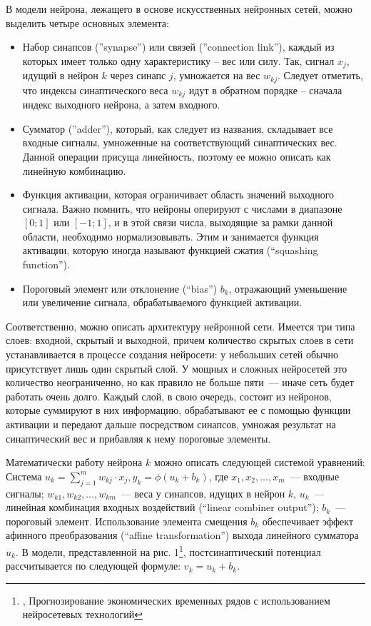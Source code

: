 \documentclass[12pt, a4paper]{article}
\begin{document}
В модели нейрона, лежащего в основе искусственных нейронных сетей, можно выделить четыре основных элемента:
\begin{itemize}
  	\item Набор синапсов (”synapse”) или связей (”connection link”), каждый из которых имеет только одну характеристику – вес или силу. Так, сигнал $x_j$, идущий в нейрон $k$ через синапс $j$, умножается на вес $w_{kj}$. Следует отметить, что индексы синаптического веса $w_{kj}$ идут в обратном порядке – сначала индекс выходного нейрона, а затем входного.
		\item Сумматор (”adder”), который, как следует из названия, складывает все входные сигналы, умноженные на соответствующий синаптических вес. Данной операции присуща линейность, поэтому ее можно описать как линейную комбинацию.
		\item Функция активации, которая ограничивает область значений выходного сигнала. Важно помнить, что нейроны оперируют с числами в диапазоне $[0; 1]$ или $[-1; 1]$, и в этой связи числа, выходящие за рамки данной области, необходимо нормализовывать. Этим и занимается функция активации, которую иногда называют функцией сжатия (“squashing function”).
		\item Пороговый элемент или отклонение (“bias”) $b_k$, отражающий уменьшение или увеличение сигнала, обрабатываемого функцией активации.
\end{itemize}

Соответственно, можно описать архитектуру нейронной сети. Имеется три типа слоев: входной, скрытый и выходной, причем количество скрытых слоев в сети устанавливается в процессе создания нейросети: у небольших сетей обычно присутствует лишь один скрытый слой.
У мощных и сложных нейросетей это количество неограниченно, но как правило не больше пяти~--- иначе сеть будет работать очень долго. Каждый слой, в свою очередь, состоит из нейронов, которые суммируют в них информацию, обрабатывают ее с помощью функции активации и передают дальше посредством синапсов, умножая результат на синаптический вес и прибавляя к нему пороговые элементы.

Математически работу нейрона $k$ можно описать следующей системой уравнений:
Система $u_k = \sum_{j=1}^m w_{kj} \cdot x_j, y_k = \phi (u_k + b_k)$, где $x_1, x_2, …, x_m$~--- входные сигналы; $w_{k1}, w_{k2}, …, w_{km}$~--- веса у синапсов, идущих в нейрон $k$, $u_k$~--- линейная комбинация входных воздействий (“linear combiner output”); $b_k$~--- пороговый элемент. Использование элемента смещения $b_k$ обеспечивает эффект афинного преобразования (“affine transformation”) выхода линейного сумматора $u_k$. В модели, представленной на рис. 1\footnote{\cite{NAE}, Прогнозирование экономических временных рядов с использованием нейросетевых технологий}, постсинаптический потенциал рассчитывается по следующей формуле: $v_k = u_k + b_k$.
\end{document}
